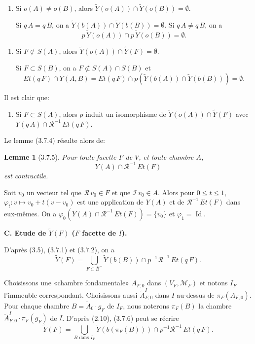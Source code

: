 \documentclass[12pt]{article}
\newtheorem{lemme}[theoreme]{Lemme}
\theoremstyle{remark}
\begin{document}
\begin{enumerate}
\item[(3.7.4.2)] Si $o(A) \neq o(B)$, alors $\tilde{Y}(o(A)) \cap \tilde{Y}(o(B)) = \emptyset$.

Si $q \, A = q \, B$, on a $\tilde{Y}(b(A)) \cap \tilde{Y}(b(B)) = \emptyset$. Si $q \, A \neq q \, B$, on a
\[p \, \tilde{Y}(o(A)) \cap p \, \tilde{Y}(o(B)) = \emptyset.\]
\end{enumerate}

\begin{enumerate}
\item[(3.7.4.3)] Si $F \not\subset S(A)$, alors $\tilde{Y}(o(A)) \cap \tilde{Y}(F) = \emptyset$.

Si $F \subset S(B)$, on a $F \not\subset S(A) \cap S(B)$ et
\[Et(q \, F) \cap Y(A, B) = Et(q \, F) \cap p(\tilde{Y}(b(A)) \cap \tilde{Y}(b(B))) = \emptyset.\]
\end{enumerate}

Il est clair que:
\begin{enumerate}
\item[(3.7.4.4)] Si $F \subset S(A)$, alors $p$ induit un isomorphisme de $\tilde{Y}(o(A)) \cap \tilde{Y}(F)$ avec $Y(q \, A) \cap \mathscr{R}^{-1} \, Et(q \, F)$.
\end{enumerate}

Le lemme (3.7.4) résulte alors de:

\begin{lemme}[3.7.5]
Pour toute facette $F$ de $V$, et toute chambre $A$,
\[Y(A) \cap \mathscr{R}^{-1} \, Et(F)\]
est contractile.
\end{lemme}

Soit $v_0$ un vecteur tel que $\mathscr{R} \, v_0 \in F$ et que $\mathscr{I} \, v_0 \in A$. Alors pour $0 \leq t \leq 1$, $\varphi_t \colon v \mapsto v_0 + t(v - v_0)$ est une application de $Y(A)$ et de $\mathscr{R}^{-1} \, Et(F)$ dans eux-mêmes. On a $\varphi_0(Y(A) \cap \mathscr{R}^{-1} \, Et(F)) = \{v_0\}$ et $\varphi_1 = \operatorname{Id}$.

\textbf{C. Etude de $\tilde{Y}(F)$ ($F$ facette de $I$).}

D'après (3.5), (3.7.1) et (3.7.2), on a
\begin{equation}
\tilde{Y}(F) = \bigcup_{F \subset \bar{B}^-} \tilde{Y}(b(B)) \cap p^{-1} \mathscr{R}^{-1} \, Et(q \, F).\tag{3.7.6}
\end{equation}

Choisissons une «chambre fondamentale» $A_{F,0}$ dans $(V_F, \mathcal{M}_F)$ et notons $I_F$ l'immeuble correspondant. Choisissons aussi $\tilde{A}^I_{F,0}$ dans $I$ au-dessus de $\pi_F(A_{F,0})$. Pour chaque chambre $B = \tilde{A}_0 \cdot g_F$ de $I_F$, nous noterons $\pi_F(B)$ la chambre $\tilde{A}^I_{F,0} \cdot \pi_F(g_F)$ de $I$. D'après (2.10), (3.7.6) peut se récrire
\[\tilde{Y}(F) = \bigcup_{B \text{ dans } I_F} \tilde{Y}(b(\pi_F(B))) \cap p^{-1} \mathscr{R}^{-1} \, Et(q \, F).\]
\end{document}
